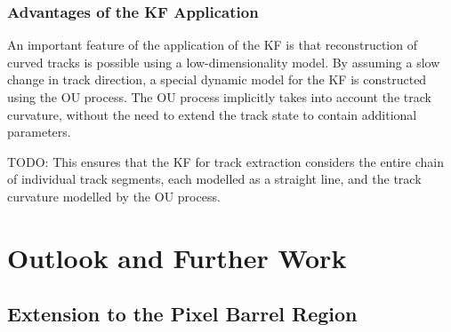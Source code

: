 



\subsubsection{Advantages of the KF Application}

An important feature of the application of the KF is that reconstruction of curved tracks is possible using a low-dimensionality model. By assuming a slow change in track direction, a special dynamic model for the KF is constructed using the OU process. The OU process implicitly takes into account the track curvature, without the need to extend the track state to contain additional parameters.


TODO: 
This ensures that the KF for track extraction considers the entire chain of individual track segments, each modelled as a straight line, and the track curvature modelled by the OU process.







\section{Outlook and Further Work}
\label{chapter-7-outlook}

\subsection{Extension to the Pixel Barrel Region}



